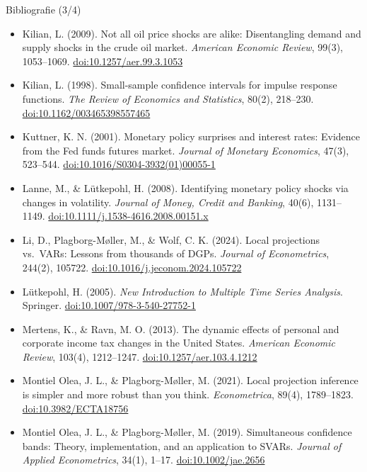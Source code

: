 \begin{frame}{Bibliografie (3/4)}
\itemsize{\tiny}
\begin{itemize}
    \item Kilian, L. (2009). Not all oil price shocks are alike: Disentangling demand and supply shocks in the crude oil market. \textit{American Economic Review}, 99(3), 1053--1069. \href{https://doi.org/10.1257/aer.99.3.1053}{doi:10.1257/aer.99.3.1053}
    \item Kilian, L. (1998). Small-sample confidence intervals for impulse response functions. \textit{The Review of Economics and Statistics}, 80(2), 218--230. \href{https://doi.org/10.1162/003465398557465}{doi:10.1162/003465398557465}
    \item Kuttner, K. N. (2001). Monetary policy surprises and interest rates: Evidence from the Fed funds futures market. \textit{Journal of Monetary Economics}, 47(3), 523--544. \href{https://doi.org/10.1016/S0304-3932(01)00055-1}{doi:10.1016/S0304-3932(01)00055-1}
    \item Lanne, M., \& Lütkepohl, H. (2008). Identifying monetary policy shocks via changes in volatility. \textit{Journal of Money, Credit and Banking}, 40(6), 1131--1149. \href{https://doi.org/10.1111/j.1538-4616.2008.00151.x}{doi:10.1111/j.1538-4616.2008.00151.x}
    \item Li, D., Plagborg-Møller, M., \& Wolf, C. K. (2024). Local projections vs.\ VARs: Lessons from thousands of DGPs. \textit{Journal of Econometrics}, 244(2), 105722. \href{https://doi.org/10.1016/j.jeconom.2024.105722}{doi:10.1016/j.jeconom.2024.105722}
    \item Lütkepohl, H. (2005). \textit{New Introduction to Multiple Time Series Analysis}. Springer. \href{https://doi.org/10.1007/978-3-540-27752-1}{doi:10.1007/978-3-540-27752-1}
    \item Mertens, K., \& Ravn, M. O. (2013). The dynamic effects of personal and corporate income tax changes in the United States. \textit{American Economic Review}, 103(4), 1212--1247. \href{https://doi.org/10.1257/aer.103.4.1212}{doi:10.1257/aer.103.4.1212}
    \item Montiel Olea, J. L., \& Plagborg-Møller, M. (2021). Local projection inference is simpler and more robust than you think. \textit{Econometrica}, 89(4), 1789--1823. \href{https://doi.org/10.3982/ECTA18756}{doi:10.3982/ECTA18756}
    \item Montiel Olea, J. L., \& Plagborg-Møller, M. (2019). Simultaneous confidence bands: Theory, implementation, and an application to SVARs. \textit{Journal of Applied Econometrics}, 34(1), 1--17. \href{https://doi.org/10.1002/jae.2656}{doi:10.1002/jae.2656}

\end{itemize}
\end{frame}
